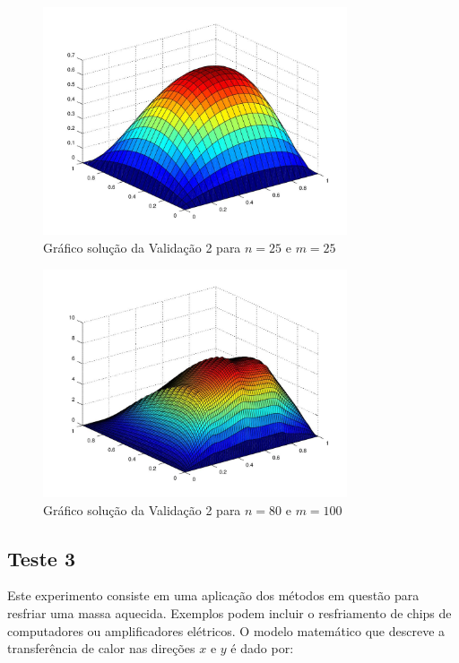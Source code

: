 \documentclass[
	11pt,				%
	oneside,			%
	a4paper,			%
	english,			%
	brazil,				%
	]{article}
\begin{document}
\begin{figure}[h]
    \centering
    \includegraphics[width=0.8\textwidth]{v2_25-25}
    \caption{Gráfico solução da Validação 2 para $n = 25$ e $m = 25$}
    \label{fig:v2_25-25}
\end{figure}

\begin{figure}[h]
    \centering
    \includegraphics[width=0.8\textwidth]{v2_80-100}
    \caption{Gráfico solução da Validação 2 para $n = 80$ e $m = 100$}
    \label{fig:v2_80-100}
\end{figure}

\subsection{Teste 3}
Este experimento consiste em uma aplicação dos métodos em questão para resfriar 
uma massa aquecida. Exemplos podem incluir o resfriamento de chips de 
computadores ou amplificadores elétricos. O modelo matemático que descreve a 
transferência de calor nas direções $x$ e $y$ é dado por:
\end{document}
